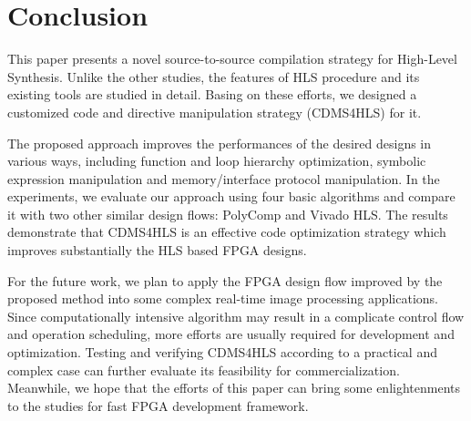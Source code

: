 \documentclass[10pt,twocolumn,letterpaper]{article}
\begin{document}
\section{Conclusion}
\label{sect:conclusion}

This paper presents a novel source-to-source compilation strategy for High-Level Synthesis. Unlike the other studies, the features of HLS procedure and its existing tools are studied in detail. Basing on these efforts, we designed a customized
code and directive manipulation strategy (CDMS4HLS) for it.

The proposed approach improves the performances of the desired designs in various ways, including function and loop hierarchy optimization, symbolic expression manipulation and memory/interface protocol manipulation. In the experiments, we evaluate our approach using four basic algorithms and compare it with two other similar design flows: PolyComp and Vivado HLS. The results demonstrate that CDMS4HLS is an effective code optimization strategy which improves substantially the HLS based FPGA designs.

For the future work, we plan to apply the FPGA design flow improved by the proposed method into some complex real-time image processing applications. Since computationally intensive algorithm may result in a complicate control flow and operation scheduling, more efforts are usually required for development and optimization. Testing and verifying CDMS4HLS according to a practical and complex case can further evaluate its feasibility for commercialization. Meanwhile, we hope that the efforts of this paper can bring some enlightenments to the studies for fast FPGA development framework.

%  
% 


{\small
\printbibliography
}
\end{document}
